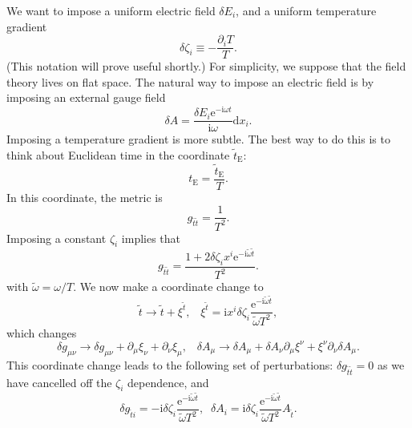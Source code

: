 \documentclass[10pt, oneside]{book}
\begin{document}
\begin{doublespace}
We want to impose a uniform electric field $\delta E_i$, and a uniform temperature gradient \begin{equation}
\delta \zeta_i \equiv -\frac{\partial_i T}{T}.
\end{equation}
(This notation will prove useful shortly.)  For simplicity, we suppose that the field theory lives on flat space.  The natural way to impose an electric field is by imposing an external gauge field \begin{equation}
\delta A = \frac{\delta E_i \mathrm{e}^{-\mathrm{i}\omega t}}{\mathrm{i}\omega} \mathrm{d}x_i.   \label{eq:Aperturb}
\end{equation}Imposing a temperature gradient is more subtle.   The best way to do this is to think about Euclidean time in the coordinate $\tilde t_{\mathrm{E}}$: \begin{equation}
t_{\mathrm{E}} = \frac{\tilde t_{\mathrm{E}}}{T}.
\end{equation}
In this coordinate, the metric is \begin{equation}
g_{\tilde{t}\tilde{t}} = \frac{1}{T^2}.
\end{equation}
Imposing a constant $\zeta_i$ implies that \begin{equation}
g_{\tilde{t}\tilde{t}} = \frac{1+2\delta \zeta_i x^i\mathrm{e}^{-\mathrm{i}\tilde \omega \tilde t}}{T^2}.
\end{equation}
with $\tilde\omega = \omega/T$.  We now make a coordinate change to \begin{equation}
\tilde{t} \rightarrow \tilde{t}+ \xi^{\tilde{t}}, \;\;\; \xi^{\tilde t} = \mathrm{i}x^i \delta \zeta_i \frac{ \mathrm{e}^{-\mathrm{i}\tilde{\omega}\tilde{t}}}{\tilde\omega T^2},
\end{equation}which changes \begin{equation}
\delta g_{\mu\nu} \rightarrow \delta g_{\mu\nu} + \partial_\mu \xi_\nu + \partial_\nu \xi_\mu, \;\;\; \delta A_\mu \rightarrow \delta A_\mu + \delta A_\nu \partial_\mu \xi^\nu + \xi^\nu \partial_\nu \delta A_\mu.
\end{equation}
This coordinate change leads to the following set of perturbations:  $\delta g_{\tilde{t}\tilde{t}}=0$ as we have cancelled off the $\zeta_i$ dependence, and  \begin{equation}
\delta g_{\tilde{t}i} = -\mathrm{i} \delta \zeta_i \frac{ \mathrm{e}^{-\mathrm{i}\tilde{\omega}\tilde{t}}}{\tilde\omega T^2}, \;\; \delta A_i = \mathrm{i} \delta\zeta_i \frac{\mathrm{e}^{-\mathrm{i}\tilde{\omega}\tilde{t}} }{\tilde\omega T^2}A_{\tilde{t}} .  \label{eq:zetaperturb}
\end{equation}


\end{doublespace}
\end{document}

